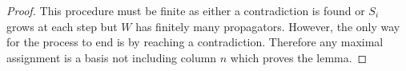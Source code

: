 \documentclass[11pt]{article}
\newcommand{\drawWLD}[2]{

\pgfmathsetmacro{\n}{#1}
\pgfmathsetmacro{\radius}{#2}
\pgfmathsetmacro{\angle}{360/\n}
\draw (0,0) circle (\radius);
    \foreach \i in {1,2,...,\n} {
      \draw (\angle*\i:\radius) node {$\bullet$};
    }

}
\newcommand{\drawprop}[4]{
\pgfmathsetmacro{\r}{#1}
\pgfmathsetmacro{\bumpr}{#2}
\pgfmathsetmacro{\s}{#3}
\pgfmathsetmacro{\bumps}{#4}
\pgfmathsetmacro{\perturbe}{\angle/\n}

\begin{scope}
\draw[propagator] (\angle*\r + \angle/2 + \bumpr*\perturbe:\radius) -- (\angle*\s + \angle/2 + \bumps*\perturbe:\radius);
\end{scope}
}
\theoremstyle{remark}
\theoremstyle{definition}
\begin{document}
\begin{proof}
This procedure must be finite as either a contradiction is found or $S_i$ grows at each step but $W$ has finitely many propagators.  However, the only way for the process to end is by reaching a contradiction.  Therefore any maximal assignment is a basis not including column $n$ which proves the lemma.
\end{proof}



%
%
%
%
%
%
%
%
%
%
\end{document}
